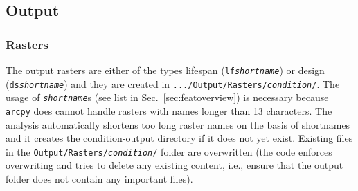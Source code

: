 \subsection{Output}
\label{sec:output}
\subsubsection{Rasters}
The output rasters are either of the types lifespan (\texttt{lf{\myUnderscore}\textit{shortname}}) or design (\texttt{ds{\myUnderscore}\textit{shortname}}) and they are created in \texttt{.../Output/Rasters/\textit{condition}/}. The usage of \texttt{\textit{shortname}}s (see list in Sec.~\ref{sec:featoverview}) is necessary because \texttt{arcpy} does cannot handle rasters with names longer than 13 characters. The analysis automatically shortens too long raster names on the basis of shortnames and it creates the condition-output directory if it does not yet exist. Existing files in the \texttt{Output/Rasters/\textit{condition}/} folder are overwritten (the code enforces overwriting and tries to delete any existing content, i.e., ensure that the output folder does not contain any important files).

